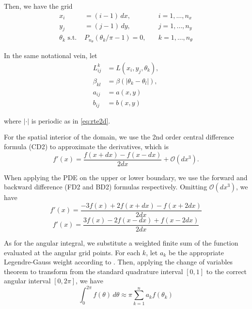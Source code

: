 \documentclass[10pt]{article}
\newcommand\abs[1]{\left| #1 \right|}
\begin{document}
\begin{multicols}{2}
Then, we have the grid
\begin{align}
    x_i &= (i-1)\,dx, &\quad i=1,\ldots,n_x \\
    y_j &= (j-1)\,dy, &\quad j=1,\ldots,n_y \\
    \theta_k \,\, \mbox{s.t.}\,\,
    &P_{n_\theta}(\theta_k/\pi-1) = 0, &\quad k=1,\ldots,n_\theta
\end{align}

In the same notational vein, let \\[-1em]
\begin{align}
    L_{ij}^k &= L(x_i,y_j,\theta_k), \\
    \beta_{kl} &= \beta(\abs{\theta_k-\theta_l}), \\
    a_{ij} &= a(x,y) \\
    b_{ij} &= b(x,y)
\end{align}

where $\abs{\cdot}$ is periodic as in \eqref{eq:rte2d}.

For the spatial interior of the domain, we use the 2nd order central difference formula (CD2) to approximate the derivatives, which is
\begin{equation}
    \tag{CD2}
    f'(x) = \frac{f(x+dx)-f(x-dx)}{2dx} + \mathcal{O}(dx^3).
\end{equation}

When applying the PDE on the upper or lower boundary, we use the forward and backward difference (FD2 and BD2) formulas respectively.
Omitting $\mathcal{O}(dx^3)$, we have
\begin{equation}
    \tag{FD2}
    \label{eq:FD2}
    f'(x) = \frac{-3f(x)+2f(x+dx)-f(x+2dx)}{2dx}
\end{equation}
\begin{equation}
    \tag{BD2}
    \label{eq:BD2}
    f'(x) = \frac{3f(x)-2f(x-dx)+f(x-2dx)}{2dx}
\end{equation}

As for the angular integral, we substitute a weighted finite sum of the function evaluated at the angular grid points.
For each $k$, let $a_k$ be the appropriate Legendre-Gauss weight according to \citet[Chapter 2]{chandrasekhar_radiative_1960}.
Then, applying the change of variables theorem to transform from the standard quadrature interval $[0,1]$ to the correct angular interval $[0,2\pi]$, we have
\begin{equation}
    \tag{LG}
    \int_0^{2\pi} f(\theta)\,d\theta \approx \pi\sum_{k=1}^n a_k f(\theta_k)
\end{equation}


\end{multicols}
\end{document}
